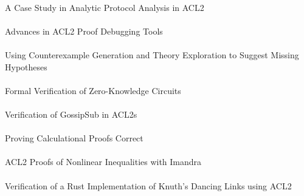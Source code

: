 \documentclass{article}
\begin{document}
\cite{23-von-hippel-protocol} \\
A Case Study in Analytic Protocol Analysis in {ACL2} \\

\cite{23-kaufmann-debugging} \\
Advances in {ACL2} Proof Debugging Tools \\

\cite{23-gamboa-missing} \\
Using Counterexample Generation and Theory Exploration to Suggest Missing Hypotheses \\

\cite{23-coglio-zkc} \\
Formal Verification of Zero-Knowledge Circuits \\

\cite{23-kumar-gossipsub} \\
Verification of GossipSub in {ACL2s} \\

\cite{23-walter-calculational} \\
Proving Calculational Proofs Correct \\

\cite{23-passmore-imandra} \\
{ACL2} Proofs of Nonlinear Inequalities with Imandra \\

\cite{23-hardin-dancing} \\
Verification of a Rust Implementation of Knuth's Dancing Links using {ACL2} \\




\end{document}
